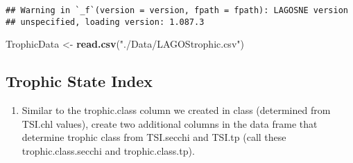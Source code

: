 \documentclass[]{article}
\newenvironment{Shaded}{\begin{snugshade}}{\end{snugshade}}
\newcommand{\DataTypeTok}[1]{\textcolor[rgb]{0.13,0.29,0.53}{#1}}
\newcommand{\DecValTok}[1]{\textcolor[rgb]{0.00,0.00,0.81}{#1}}
\newcommand{\KeywordTok}[1]{\textcolor[rgb]{0.13,0.29,0.53}{\textbf{#1}}}
\newcommand{\NormalTok}[1]{#1}
\newcommand{\OperatorTok}[1]{\textcolor[rgb]{0.81,0.36,0.00}{\textbf{#1}}}
\newcommand{\StringTok}[1]{\textcolor[rgb]{0.31,0.60,0.02}{#1}}
\providecommand{\tightlist}{%
  \setlength{\itemsep}{0pt}\setlength{\parskip}{0pt}}
\begin{document}
\begin{verbatim}
## Warning in `_f`(version = version, fpath = fpath): LAGOSNE version
## unspecified, loading version: 1.087.3
\end{verbatim}

\begin{Shaded}
\begin{Highlighting}[]
\NormalTok{TrophicData <-}\StringTok{ }\KeywordTok{read.csv}\NormalTok{(}\StringTok{"./Data/LAGOStrophic.csv"}\NormalTok{)}
\end{Highlighting}
\end{Shaded}

\hypertarget{trophic-state-index}{%
\subsection{Trophic State Index}\label{trophic-state-index}}

\begin{enumerate}
\def\labelenumi{\arabic{enumi}.}
\setcounter{enumi}{4}
\tightlist
\item
  Similar to the trophic.class column we created in class (determined
  from TSI.chl values), create two additional columns in the data frame
  that determine trophic class from TSI.secchi and TSI.tp (call these
  trophic.class.secchi and trophic.class.tp).
\end{enumerate}

\begin{Shaded}
\end{Shaded}
\end{document}
